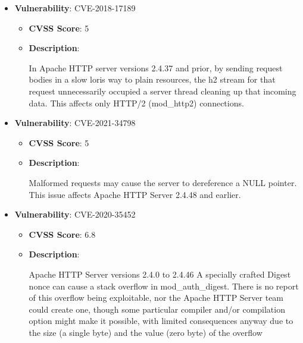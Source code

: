 \documentclass{article}
\begin{document}
\begin{itemize}
        \item \textbf{Vulnerability}: CVE-2018-17189
        \begin{itemize}
            \item \textbf{CVSS Score}:  5 
            \item \textbf{Description}:
            \parbox[t]{0.9\linewidth}{
                \ttfamily In Apache HTTP server versions 2.4.37 and prior, by sending request bodies in a slow loris way to plain resources, the h2 stream for that request unnecessarily occupied a server thread cleaning up that incoming data. This affects only HTTP/2 (mod\_http2) connections.
            }
        \end{itemize}
    
        \item \textbf{Vulnerability}: CVE-2021-34798
        \begin{itemize}
            \item \textbf{CVSS Score}:  5 
            \item \textbf{Description}:
            \parbox[t]{0.9\linewidth}{
                \ttfamily Malformed requests may cause the server to dereference a NULL pointer. This issue affects Apache HTTP Server 2.4.48 and earlier.
            }
        \end{itemize}
    
        \item \textbf{Vulnerability}: CVE-2020-35452
        \begin{itemize}
            \item \textbf{CVSS Score}:  6.8 
            \item \textbf{Description}:
            \parbox[t]{0.9\linewidth}{
                \ttfamily Apache HTTP Server versions 2.4.0 to 2.4.46 A specially crafted Digest nonce can cause a stack overflow in mod\_auth\_digest. There is no report of this overflow being exploitable, nor the Apache HTTP Server team could create one, though some particular compiler and/or compilation option might make it possible, with limited consequences anyway due to the size (a single byte) and the value (zero byte) of the overflow
            }
        \end{itemize}
    

\end{itemize}
\end{document}
